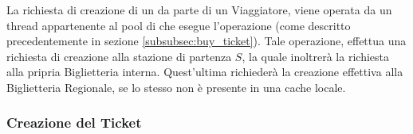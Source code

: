 	La richiesta di creazione di un  da parte di un Viaggiatore, viene operata da un thread appartenente al pool di  che esegue l'operazione  (come descritto precedentemente in sezione \ref{subsubsec:buy_ticket}). Tale operazione, effettua una richiesta di creazione alla stazione di partenza $S$, la quale inoltrerà la richiesta alla pripria Biglietteria interna. Quest'ultima richiederà la creazione effettiva alla Biglietteria Regionale, se lo stesso  non è presente in una cache locale.  
	
	\subsubsection {Creazione del Ticket} \label{subsubsec:ticket_creation}
	
